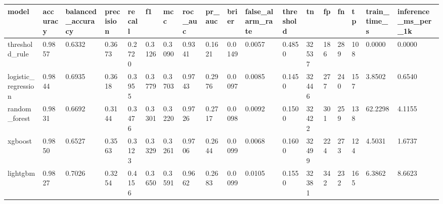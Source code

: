 \begin{tabular}{llllllllllllllllll}
\toprule
model & accuracy & balanced\_accuracy & precision & recall & f1 & mcc & roc\_auc & pr\_auc & brier & false\_alarm\_rate & threshold & tn & fp & fn & tp & train\_time\_s & inference\_ms\_per\_1k \\
\midrule
threshold\_rule & 0.9857 & 0.6332 & 0.3673 & 0.2720 & 0.3126 & 0.3090 & 0.9341 & 0.1621 & 0.0149 & 0.0057 & 0.4850 & 32537 & 186 & 289 & 108 & 0.0000 & 0.0000 \\
logistic\_regression & 0.9844 & 0.6935 & 0.3618 & 0.3955 & 0.3779 & 0.3703 & 0.9743 & 0.2976 & 0.0097 & 0.0085 & 0.1450 & 32446 & 277 & 240 & 157 & 3.8502 & 0.6540 \\
random\_forest & 0.9831 & 0.6692 & 0.3144 & 0.3476 & 0.3301 & 0.3220 & 0.9726 & 0.2717 & 0.0098 & 0.0092 & 0.1500 & 32422 & 301 & 259 & 138 & 62.2298 & 4.1155 \\
xgboost & 0.9850 & 0.6527 & 0.3563 & 0.3123 & 0.3329 & 0.3261 & 0.9706 & 0.2644 & 0.0099 & 0.0068 & 0.1600 & 32499 & 224 & 273 & 124 & 4.5031 & 1.6737 \\
lightgbm & 0.9827 & 0.7026 & 0.3254 & 0.4156 & 0.3650 & 0.3591 & 0.9662 & 0.2683 & 0.0099 & 0.0105 & 0.1550 & 32381 & 342 & 232 & 165 & 6.3862 & 8.6623 \\
\bottomrule
\end{tabular}
